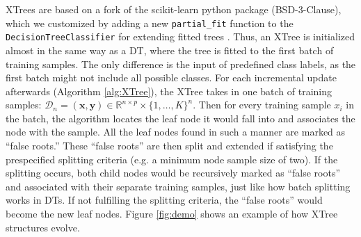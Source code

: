 XTrees are based on a fork
of the scikit-learn python package (BSD-3-Clause), which we customized by adding a new \texttt{partial\_fit} function to the \texttt{DecisionTreeClassifier} for extending fitted trees \citep{pedregosa_scikit-learn_2011}. Thus, an XTree is initialized almost in the same way as a DT, where the tree is fitted to the first batch of training samples. The only difference is the input of predefined class labels, as the first batch might not include all possible classes. 
For each incremental update afterwards (Algorithm \ref{alg:XTree}), the XTree takes in one batch of training samples: $\mathcal{D}_n = (\mathbf{x},\mathbf{y}) \in \mathbb{R}^{n \times p} \times \{1,\ldots, K\}^n$. 
Then for every training sample $x_i$ in the batch, the algorithm locates the leaf node it would fall into and associates the node with the sample. All the leaf nodes found in such a manner are marked as ``false roots.'' 
These ``false roots'' are then split and extended if satisfying the prespecified splitting criteria (e.g. a minimum node sample size of two). 
If the splitting occurs, both child nodes would be recursively marked as ``false roots'' and associated with their separate training samples, just like how batch splitting works in DTs. If not fulfilling the splitting criteria, the ``false roots'' would become the new leaf nodes. Figure \ref{fig:demo} shows an example of how XTree structures evolve. 

